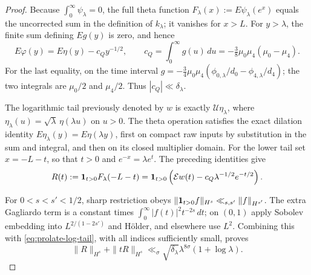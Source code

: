 \begin{proof}
Because $\int_0^\infty\psi_\lambda=0$, the full theta function
$F_\lambda(x):=E\psi_\lambda(e^x)$ equals the uncorrected sum in
the definition of $k_\lambda$; it vanishes for $x>L$.
For $y>\lambda$, the finite sum defining $Eg(y)$ is zero, and hence
\[
 E\varphi(y)=E\eta(y)-c_Qy^{-1/2},\qquad
 c_Q=\int_0^\infty g(u)\,du
       =-\tfrac38\mu_0\mu_4(\mu_0-\mu_4).
\]
For the last equality, on the time interval
$g=-\tfrac34\mu_0\mu_4(\phi_{0,\lambda}/d_0-
\phi_{4,\lambda}/d_4)$; the two integrals are $\mu_0/2$ and
$\mu_4/2$. Thus $|c_Q|\ll\delta_\lambda$.

The logarithmic tail previously denoted by $w$ is exactly
$\mathcal U\eta_\lambda$, where
$\eta_\lambda(u)=\sqrt\lambda\,\eta(\lambda u)$ on $u>0$.
The theta operation satisfies the exact dilation identity
$E\eta_\lambda(y)=E\eta(\lambda y)$, first on compact raw inputs
by substitution in the sum and integral, and then on its closed
multiplier domain. For the lower tail set $x=-L-t$, so that
$t>0$ and $e^{-x}=\lambda e^t$. The preceding identities give
\begin{equation}
 R(t):={\bf1}_{t>0}F_\lambda(-L-t)
 = {\bf1}_{t>0}\left(\mathcal Ew(t)
                    -c_Q\lambda^{-1/2}e^{-t/2}\right).
 \label{eq:prolate-lower-tail}
\end{equation}

For $0<s<s'<1/2$, sharp restriction obeys
$\|{\bf1}_{t>0}f\|_{H^s}\ll_{s,s'}\|f\|_{H^{s'}}$.
The extra Gagliardo term is a constant times
$\int_0^\infty|f(t)|^2t^{-2s}\,dt$; on $(0,1)$ apply Sobolev
embedding into $L^{2/(1-2s')}$ and H\"older, and elsewhere use $L^2$.
Combining this with \eqref{eq:prolate-log-tail}, with all indices
sufficiently small, proves
\[
 \|R\|_{H^s}+\|tR\|_{H^s}
       \ll_\sigma\sqrt{\delta_\lambda}\lambda^{8\sigma}
                          (1+\log\lambda).
\]


\end{proof}

